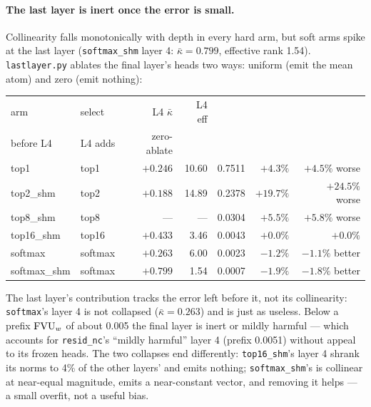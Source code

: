 \paragraph{The last layer is inert once the error is small.} Collinearity
falls monotonically with depth in every hard arm, but soft arms spike at
the last layer (\texttt{softmax\_shm} layer 4: $\bar\kappa{=}0.799$, effective rank
1.54). \texttt{lastlayer.py} ablates the final layer's heads two ways:
uniform (emit the mean atom) and zero (emit nothing):

\begin{center}\small
\begin{tabular}{@{}llrrrrr@{}}
\toprule
arm & select & L4 $\bar\kappa$ & L4 eff & \stackhead[r]{prefix $\fvu$\\before L4} & L4 adds & zero-ablate \\
\midrule
top1         & top1    & $+0.246$ & 10.60 & 0.7511 & $+4.3\%$  & $+4.5\%$ worse \\
top2\_shm    & top2    & $+0.188$ & 14.89 & 0.2378 & $+19.7\%$ & $+24.5\%$ worse \\
top8\_shm    & top8    & ---      & ---   & 0.0304 & $+5.5\%$  & $+5.8\%$ worse \\
top16\_shm   & top16   & $+0.433$ & 3.46  & 0.0043 & $+0.0\%$  & $+0.0\%$ \\
softmax      & softmax & $+0.263$ & 6.00  & 0.0023 & $-1.2\%$  & $-1.1\%$ better \\
softmax\_shm & softmax & $+0.799$ & 1.54  & 0.0007 & $-1.9\%$  & $-1.8\%$ better \\
\bottomrule
\end{tabular}
\end{center}

The last layer's contribution tracks the error left before it, not its
collinearity: \texttt{softmax}'s layer 4 is not collapsed ($\bar\kappa{=}0.263$)
and is just as useless. Below a prefix $\fvu$ of about 0.005 the final
layer is inert or mildly harmful --- which accounts for
\texttt{resid\_nc}'s ``mildly harmful'' layer 4 (prefix 0.0051) without
appeal to its frozen heads. The two collapses end differently:
\texttt{top16\_shm}'s layer 4 shrank its norms to 4\% of the other
layers' and emits nothing; \texttt{softmax\_shm}'s is collinear at
near-equal magnitude, emits a near-constant vector, and removing it
helps --- a small overfit, not a useful bias.

